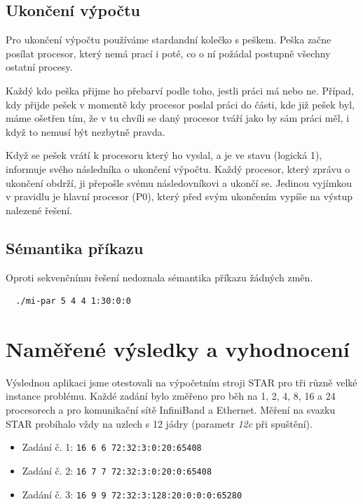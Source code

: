 \documentclass[12pt]{article}
\begin{document}
\subsection{Ukončení výpočtu}
Pro ukončení výpočtu používáme stardandní kolečko s peškem. Peška začne posílat
procesor, který nemá prací i poté, co o ní požádal postupně všechny ostatní procesy. 

Každý kdo peška přijme ho přebarví podle toho, jestli práci má nebo ne. Případ,
kdy přijde pešek v momentě kdy procesor poslal práci do části, kde již pešek
byl, máme ošetřen tím, že v tu chvíli se daný procesor tváří jako by sám práci
měl, i když to nemusí být nezbytně pravda. 

Když se pešek vrátí k procesoru který ho vyslal, a je ve stavu 
(logická 1), informuje svého následníka o ukončení výpočtu. Každý procesor,
který zprávu o ukončení obdrží, ji přepošle svému následovníkovi a ukončí se.
Jedinou vyjímkou v pravidlu je hlavní procesor (P0), který před svým ukončením
vypíše na výstup nalezené řešení.

\subsection{Sémantika příkazu}
Oproti sekvenčnímu řešení nedoznala sémantika příkazu žádných změn. 
\begin{verbatim}
  ./mi-par 5 4 4 1:30:0:0                 
\end{verbatim}

\section{Naměřené výsledky a vyhodnocení}

Výslednou aplikaci jsme otestovali na výpočetním stroji STAR pro tři různě velké
instance problému. Každé zadání bylo změřeno pro běh na 1, 2, 4, 8, 16 a 24
procesorech a pro komunikační sítě InfiniBand a Ethernet. Měření na svazku STAR
probíhalo vždy na uzlech s 12 jádry (parametr \textit{12c} při spuštění).

\begin{itemize}
\item Zadání č. 1: \texttt{16 6 6 72:32:3:0:20:65408}
\item Zadání č. 2: \texttt{16 7 7 72:32:3:0:20:0:65408}
\item Zadání č. 3: \texttt{16 9 9 72:32:3:128:20:0:0:0:65280}



\end{itemize}
\end{document}
